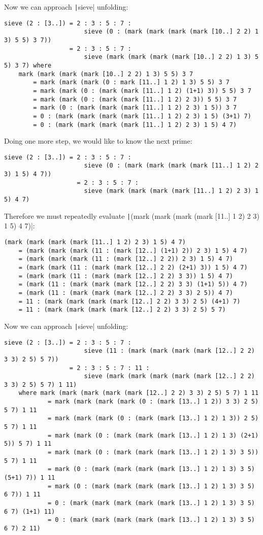 Now we can approach \texttt|sieve| unfolding:
\begin{verbatim}
sieve (2 : [3..]) = 2 : 3 : 5 : 7 : 
                      sieve (0 : (mark (mark (mark (mark [10..] 2 2) 1 3) 5 5) 3 7)) 
                  = 2 : 3 : 5 : 7 : 
                      sieve (mark (mark (mark (mark [10..] 2 2) 1 3) 5 5) 3 7) where
    mark (mark (mark (mark [10..] 2 2) 1 3) 5 5) 3 7
        = mark (mark (mark (0 : mark [11..] 1 2) 1 3) 5 5) 3 7
        = mark (mark (0 : (mark (mark [11..] 1 2) (1+1) 3)) 5 5) 3 7
        = mark (mark (0 : (mark (mark [11..] 1 2) 2 3)) 5 5) 3 7
        = mark (0 : (mark (mark (mark [11..] 1 2) 2 3) 1 5)) 3 7
        = 0 : (mark (mark (mark (mark [11..] 1 2) 2 3) 1 5) (3+1) 7)
        = 0 : (mark (mark (mark (mark [11..] 1 2) 2 3) 1 5) 4 7)
\end{verbatim}
Doing one more step, we would like to know the next prime:
\begin{verbatim}
sieve (2 : [3..]) = 2 : 3 : 5 : 7 : 
                      sieve (0 : (mark (mark (mark (mark [11..] 1 2) 2 3) 1 5) 4 7))
                    = 2 : 3 : 5 : 7 : 
                      sieve (mark (mark (mark (mark [11..] 1 2) 2 3) 1 5) 4 7)
\end{verbatim}
Therefore we must repeatedly evaluate \texttt|(mark (mark (mark (mark [11..] 1 2) 2 3) 1 5) 4 7)|:
\begin{verbatim}
(mark (mark (mark (mark [11..] 1 2) 2 3) 1 5) 4 7)
    = (mark (mark (mark (11 : (mark [12..] (1+1) 2)) 2 3) 1 5) 4 7)
    = (mark (mark (mark (11 : (mark [12..] 2 2)) 2 3) 1 5) 4 7)
    = (mark (mark (11 : (mark (mark [12..] 2 2) (2+1) 3)) 1 5) 4 7)
    = (mark (mark (11 : (mark (mark [12..] 2 2) 3 3)) 1 5) 4 7)
    = (mark (11 : (mark (mark (mark [12..] 2 2) 3 3) (1+1) 5)) 4 7)
    = (mark (11 : (mark (mark (mark [12..] 2 2) 3 3) 2 5)) 4 7)
    = 11 : (mark (mark (mark (mark [12..] 2 2) 3 3) 2 5) (4+1) 7)
    = 11 : (mark (mark (mark (mark [12..] 2 2) 3 3) 2 5) 5 7)
\end{verbatim}
Now we can approach \texttt|sieve| unfolding:
\begin{verbatim}
sieve (2 : [3..]) = 2 : 3 : 5 : 7 : 
                      sieve (11 : (mark (mark (mark (mark [12..] 2 2) 3 3) 2 5) 5 7))
                  = 2 : 3 : 5 : 7 : 11 :
                      sieve (mark (mark (mark (mark (mark [12..] 2 2) 3 3) 2 5) 5 7) 1 11)
    where mark (mark (mark (mark (mark [12..] 2 2) 3 3) 2 5) 5 7) 1 11
            = mark (mark (mark (mark (0 : (mark [13..] 1 2)) 3 3) 2 5) 5 7) 1 11
            = mark (mark (mark (0 : (mark (mark [13..] 1 2) 1 3)) 2 5) 5 7) 1 11
            = mark (mark (0 : (mark (mark (mark [13..] 1 2) 1 3) (2+1) 5)) 5 7) 1 11
            = mark (mark (0 : (mark (mark (mark [13..] 1 2) 1 3) 3 5)) 5 7) 1 11
            = mark (0 : (mark (mark (mark (mark [13..] 1 2) 1 3) 3 5) (5+1) 7)) 1 11
            = mark (0 : (mark (mark (mark (mark [13..] 1 2) 1 3) 3 5) 6 7)) 1 11
            = 0 : (mark (mark (mark (mark (mark [13..] 1 2) 1 3) 3 5) 6 7) (1+1) 11)
            = 0 : (mark (mark (mark (mark (mark [13..] 1 2) 1 3) 3 5) 6 7) 2 11)
\end{verbatim}

